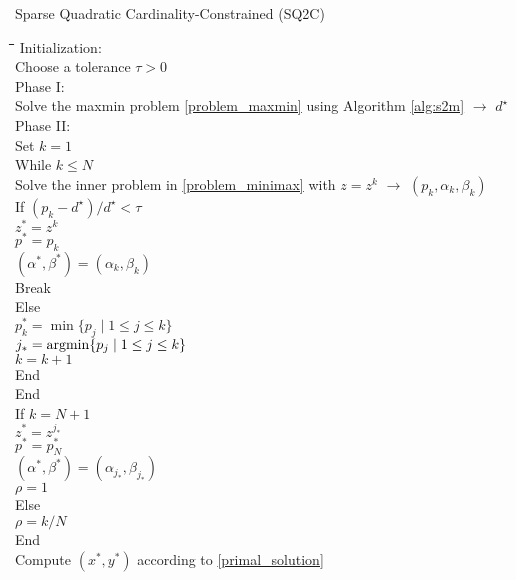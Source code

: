 \documentclass[smallextended,referee,envcountsect]{svjour3}
\begin{document}
\begin{algorithm}
\caption{Sparse Quadratic Cardinality-Constrained (SQ2C)}
\label{alg:sq2c}
\begin{tabbing}
\hspace*{7mm}\=\hspace*{7mm}\=\hspace*{7mm}\=\hspace*{7mm}\=
\hspace*{7mm}\=\hspace*{7mm}\=\kill
{\sc Initialization}: \+ \\ Choose a tolerance $\tau>0$ \- \\
{\sc Phase I}: \+ \\ Solve the maxmin problem \eqref{problem_maxmin} using 
Algorithm \ref{alg:s2m} $\longrightarrow$ $d^\star$ \- \\ 
{\sc Phase II}: \+ \\ Set $k = 1$ \\
{\sc While $k \leq N$} \+ \\
Solve the inner problem in \eqref{problem_minimax} with $z = z^k$ $\longrightarrow$ 
$(p_k,\alpha_k,\beta_k)$  \\ 
{\sc If} ${(p_k-d^\star)}/{d^\star} < \tau$ \+ \\ 
$z^* = z^k$ \\ $p^* = p_k$ \\ $(\alpha^*,\beta^*) = (\alpha_k,\beta_k)$ \\ 
{\sc Break} \- \\ 
{\sc Else} \+ \\ 
$p_k^* = \min\{p_j\mid 1 \leq j \leq k\}$ \\
$j_* = {\rm argmin}\{p_j\mid 1 \leq j \leq k\}$ \\
$k=k+1$ \- \\ 
{\sc End} \- \\ 
{\sc End} \\ 
{\sc If} $k = N + 1$ \+ \\ 
$z^* = z^{j_*}$ \\ $p^* = p_N^*$ \\ $(\alpha^*,\beta^*) = (\alpha_{j_*},\beta_{j_*})$ \\ 
$\rho = 1$ \- \\ 
{\sc Else} \+ \\ 
$\rho = {k}/{N}$ \- \\ 
{\sc End} \\ 
Compute $(x^*,y^*)$ according to \eqref{primal_solution}
\end{tabbing}
\end{algorithm}
\end{document}
